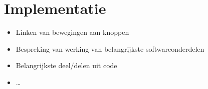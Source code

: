 \chapter{Implementatie}

\begin{itemize}
\item Linken van bewegingen aan knoppen
\item Bespreking van werking van belangrijkste softwareonderdelen
\item Belangrijkste deel/delen uit code
\item \ldots
\end{itemize}